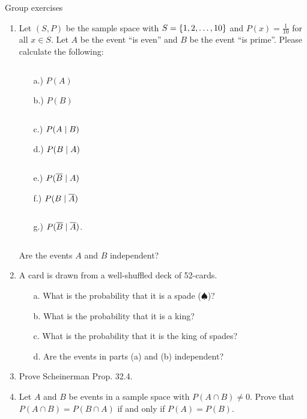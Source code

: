 \documentclass[10pt]{beamer}
\begin{document}
\begin{frame}{Group exercises}

\begin{enumerate}
	\item Let $(S,P)$ be the sample space with $S=\{ {1,2,\hdots, 10} \}$ and $P(x) =\frac{1}{10}$ for all $x \in S$.  Let $A$ be the event \enquote{is even} and $B$ be the event \enquote{is prime}.  Please calculate the following:
	\vspace{-0.5cm}
    \begin{columnsonlytextwidth}
    \begin{column}[t]{0.22\textwidth}
        \begin{itemize} \small
		\item[a.)] $P(A)$ 
		\item[b.)] $P(B)$
        \end{itemize}
    \end{column}
    \begin{column}[t]{0.22\textwidth}
        \begin{itemize} \small
      	\item[c.)] $P(A \; | \; B)$
		\item[d.)] $P(B \; | \; A)$ 
        \end{itemize}
    \end{column}
     \begin{column}[t]{0.22\textwidth}
        \begin{itemize} \small
		\item[e.)] $P(\overline{B} \; | \; A)$ 
		\item[f.)] $P(B \; | \; \overline{A})$
        \end{itemize}
    \end{column}
    \begin{column}[t]{0.22\textwidth}
        \begin{itemize} \small
		\item[g.)] $P(\overline{B} \; | \; \overline{A})$. 
        \end{itemize}
    \end{column}
    \end{columnsonlytextwidth}
    \vspace{.2cm}
     Are the events $A$ and $B$ independent?
\item A card is drawn from a well-shuffled deck of 52-cards.
	\begin{itemize}
	\item[a.] What is the probability that it is a spade ($\spadesuit$)?
	\item[b.] What is the probability that it is a king?	
	\item[c.] What is the probability that it is the king of spades?
	\item[d.] Are the events in parts (a) and (b) independent?
	\end{itemize}
\item Prove Scheinerman Prop. 32.4.
\item Let $A$ and $B$ be events in a sample space with $P(A \cap B) \neq 0$.  Prove that $P(A \cap B) = P(B \cap A)$ if and only if $P(A) = P(B)$.
\end{enumerate}

\end{frame}
\end{document}
